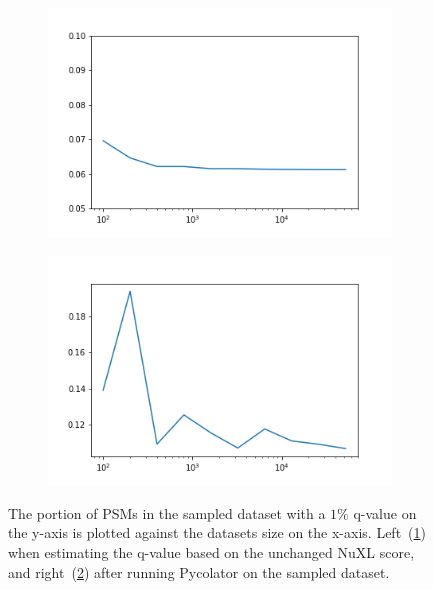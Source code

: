 \begin{figure}
	\normalsize
	\centering
	\begin{subfigure}{0.49 \textwidth}
		\includegraphics[width = \textwidth]{figures/ratio_idents_whole_df_NuXL.png}
		\caption{}
		\label{fig:results:small_dataset_first_ratio_dxl}
	\end{subfigure}
	\hfill
	\begin{subfigure}{0.49 \textwidth}
		\includegraphics[width = \textwidth]{figures/ratio_idents_whole_df_percolator.png}
		\caption{}
		\label{fig:results:small_dataset_first_auc_ratio_pxl}
	\end{subfigure}
	\caption[]{The portion of PSMs in the sampled dataset with a $1\%$ q-value on the y-axis is plotted against the datasets size on the x-axis. Left~(\ref{fig:results:small_dataset_first_ratio_dxl}) when estimating the q-value based on the unchanged NuXL score, and right~(\ref{fig:results:small_dataset_first_auc_ratio_pxl}) after running Pycolator on the sampled dataset.}
	\label{fig:results:small_dataset_first_auc_ratio}
\end{figure}
